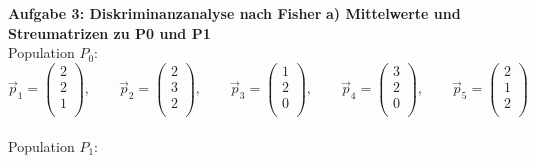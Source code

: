 \documentclass{article}
\begin{document}
\textbf{Aufgabe 3: Diskriminanzanalyse nach Fisher}
\textbf{a) Mittelwerte und Streumatrizen zu P0 und P1} \\
Population $P_0$:
\[
\vec{p}_1 =
\left(
\begin {array} {c}

2 \\

2 \\

1 \\

\end {array}
\right)
, \qquad
\vec{p}_2 =
\left(
\begin {array} {c}

2 \\

3 \\

2 \\

\end {array}
\right)
, \qquad
\vec{p}_3 =
\left(
\begin {array} {c}

1 \\

2 \\

0 \\

\end {array}
\right)
, \qquad
\vec{p}_4 =
\left(
\begin {array} {c}

3 \\

2 \\

0 \\

\end {array}
\right)
, \qquad
\vec{p}_5 =
\left(
\begin {array} {c}

2 \\

1 \\

2 \\

\end {array}
\right)
\]
\\
Population $P_1$:
\end{document}
